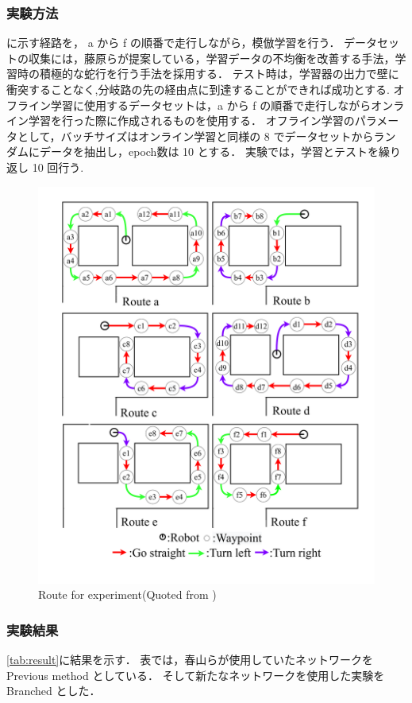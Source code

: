 \newpage
\subsubsection{実験方法}
に示す経路を， a から f の順番で走行しながら，模倣学習を行う．
データセットの収集には，藤原ら\cite{fujiwara2023}が提案している，学習データの不均衡を改善する手法，学習時の積極的な蛇行を行う手法を採用する．
テスト時は，学習器の出力で壁に衝突することなく,分岐路の先の経由点に到達することができれば成功とする.
オフライン学習に使用するデータセットは，a から f の順番で走行しながらオンライン学習を行った際に作成されるものを使用する．
オフライン学習のパラメータとして，バッチサイズはオンライン学習と同様の 8 でデータセットからランダムにデータを抽出し，epoch数は 10 とする．
実験では，学習とテストを繰り返し 10 回行う.

\begin{figure}
  \centering
  \includegraphics[width=130mm]{images/pdf/fujiwara/route.pdf}
  \caption{Route for experiment(Quoted from \cite{fujiwara2023})}
  \label{fig:fujiwara_route}
\end{figure}

\clearpage
\subsubsection{実験結果}
\ref{tab:result}に結果を示す．
表では，春山らが使用していたネットワークを Previous method としている．
そして新たなネットワークを使用した実験を Branched とした．

